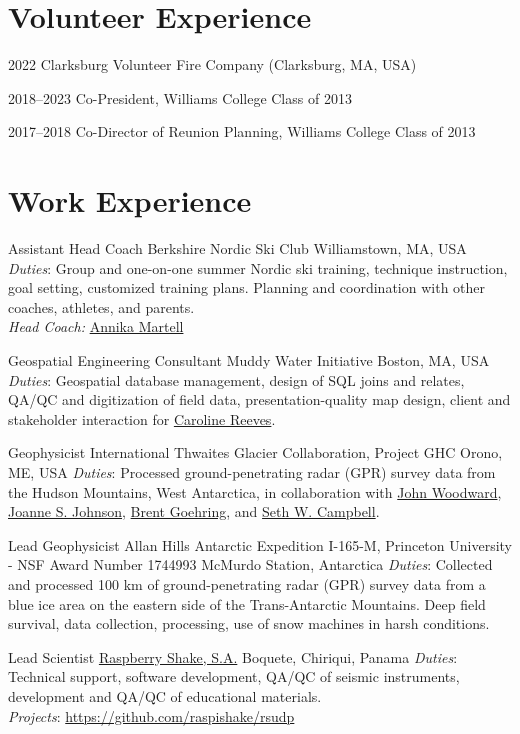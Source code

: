 \documentclass[a4paper,12pt,sans,colorlinks]{moderncv}
\newcommand{\seth}{\href{https://www.alpinesciences.net}{Seth W. Campbell}}
\newcommand{\johnwoodward}{\href{https://www.northumbria.ac.uk/about-us/our-staff/w/john-woodward}{John Woodward}}
\newcommand{\joannejohnson}{\href{https://www.bas.ac.uk/profile/jsj/}{Joanne S. Johnson}}
\newcommand{\brent}{\href{https://sse.tulane.edu/eens/faculty/goehring}{Brent Goehring}}
\newcommand{\caroline}{\href{https://www.muddywaterinitiative.org/leadership}{Caroline Reeves}}
\newcommand{\annika}{\href{https://ephsports.williams.edu/sports/mens-skiing/roster/coaches/annika-martell/525}{Annika Martell}}
\newcommand{\raspishake}{\href{https://raspberryshake.org}{Raspberry Shake, S.A.}}
\begin{document}
\section{Volunteer Experience}

\cvline
{2022}
{Clarksburg Volunteer Fire Company (Clarksburg, MA, USA)}

\cvline
{2018--2023}
{Co-President, Williams College Class of 2013}

\cvline
{2017--2018}
{Co-Director of Reunion Planning, Williams College Class of 2013}

\section{Work Experience}

{Assistant Head Coach}
{Berkshire Nordic Ski Club}
{Williamstown, MA, USA}
{}
{
    \emph{Duties}: Group and one-on-one summer Nordic ski training, technique instruction, goal setting, customized training
    plans. Planning and coordination with other coaches, athletes, and parents.\\
    \emph{Head Coach:} \annika
}

{Geospatial Engineering Consultant}
{Muddy Water Initiative}
{Boston, MA, USA}
{}
{
    \emph{Duties}: Geospatial database management, design of SQL joins and
    relates, QA/QC and digitization of field data, presentation-quality map
    design, client and stakeholder interaction for \caroline.
}

{Geophysicist}
{International Thwaites Glacier Collaboration, Project GHC}
{Orono, ME, USA}
{}
{
    \emph{Duties}: Processed ground-penetrating radar (GPR) survey data
    from the Hudson Mountains, West Antarctica, in collaboration with
    \johnwoodward, \joannejohnson, \brent, and \seth.
}

{Lead Geophysicist}
{Allan Hills Antarctic Expedition I-165-M,
Princeton University - NSF Award Number 1744993}
{McMurdo Station, Antarctica}
{}
{
    \emph{Duties}: Collected and processed 100 km of ground-penetrating
    radar (GPR) survey data from a blue ice area on the eastern side of the
    Trans-Antarctic Mountains. Deep field survival, data collection,
    processing, use of snow machines in harsh conditions.
}

{Lead Scientist}
{\raspishake{}}
{Boquete, Chiriqui, Panama}
{}
{
    \emph{Duties}: Technical support, software development,
    QA/QC of seismic instruments, development and QA/QC of
    educational materials.
    \\
    \emph{Projects}: \url{https://github.com/raspishake/rsudp}
}
\end{document}
